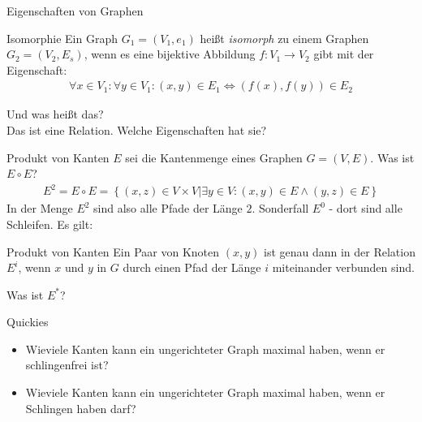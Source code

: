 \begin{frame}{Eigenschaften von Graphen}
    \begin{block}{Isomorphie}
        Ein Graph $G_1 = \left( V_1, e_1 \right) $ heißt \emph{isomorph} zu einem Graphen $G_2 = \left( V_2,E_s \right)$, wenn es eine bijektive Abbildung $f: V_1 \rightarrow V_2$ gibt mit der Eigenschaft:
        \begin{align*}
            \forall x\in V_1: \forall y \in V_1: \left( x, y \right) \in E_1 \Longleftrightarrow \left( f\left( x \right),f\left( y \right) \right)\in E_2
        \end{align*}
    \end{block}
    Und was heißt das? \\
    \pause
    Das ist eine Relation. Welche Eigenschaften hat sie?
\end{frame}

\begin{frame}{Produkt von Kanten}
    $E$ sei die Kantenmenge eines Graphen $G = \left( V,E \right)$. Was ist $E \circ E$?
    \pause
    \begin{align*}
        E^2 = E\circ E = \left\{ \left( x,z \right)\in V\times V\big| \exists y \in V: \left( x,y \right)\in E \wedge \left( y,z \right) \in E \right\}
    \end{align*}
    In der Menge $E^2$ sind also alle Pfade der Länge $2$. Sonderfall $E^0$ - dort sind alle Schleifen. Es gilt:
    \begin{block}{Produkt von Kanten}
        Ein Paar von Knoten $\left( x,y \right)$ ist genau dann in der Relation $E^i$, wenn $x$ und $y$ in $G$ durch einen Pfad der Länge $i$ miteinander verbunden sind.
    \end{block}
    \pause
    Was ist $E^*$?
\end{frame}

\begin{frame}{Quickies}
    \begin{itemize}
        \item Wieviele Kanten kann ein ungerichteter Graph maximal haben, wenn er schlingenfrei ist? 
        \item Wieviele Kanten kann ein ungerichteter Graph maximal haben, wenn er Schlingen haben darf? 
    \end{itemize}
\end{frame}

